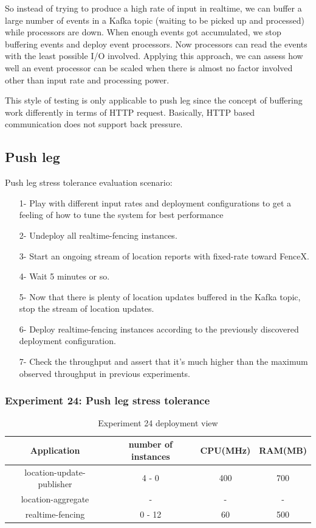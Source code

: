 \documentclass[a4]{report}
\begin{document}
    So instead of trying to produce a high rate of input in realtime, we can buffer a large number of events in a Kafka
    topic (waiting to be picked up and processed) while processors are down.
    When enough events got accumulated, we stop buffering events and deploy event processors.
    Now processors can read the events with the least possible I/O involved.
    Applying this approach, we can assess how well an event processor can be scaled when there is almost no factor involved other than input rate and processing power.

    This style of testing is only applicable to push leg since the concept of buffering work differently in terms of
    HTTP request.
    Basically, HTTP based communication does not support back pressure.

    \subsection{Push leg}
    Push leg stress tolerance evaluation scenario:
    \begin{itemize}
        \item[1-] Play with different input rates and deployment configurations to get a feeling of how to tune the
        system for best performance
        \item[2-] Undeploy all realtime-fencing instances.
        \item[3-] Start an ongoing stream of location reports with fixed-rate toward FenceX.
        \item[4-] Wait 5 minutes or so.
        \item[5-] Now that there is plenty of location updates buffered in the Kafka topic, stop the stream of location updates.
        \item[6-] Deploy realtime-fencing instances according to the previously discovered deployment configuration.
        \item[7-] Check the throughput and assert that it's much higher than the maximum observed throughput in previous experiments.
    \end{itemize}

    \subsubsection{Experiment 24: Push leg stress tolerance}
    \begin{table}[h!]
        \centering
        \begin{tabular}{|c|c|c|c|}
            \hline
            Application               & number of instances & CPU(MHz) & RAM(MB) \\
            \hline
            location-update-publisher & 4 - 0               & 400      & 700     \\
            location-aggregate        & -                   & -        & -       \\
            realtime-fencing          & 0 - 12              & 60       & 500     \\
            \hline
        \end{tabular}
        \caption{Experiment 24 deployment view}
        \label{table:ex24-dv}
    \end{table}
\end{document}
